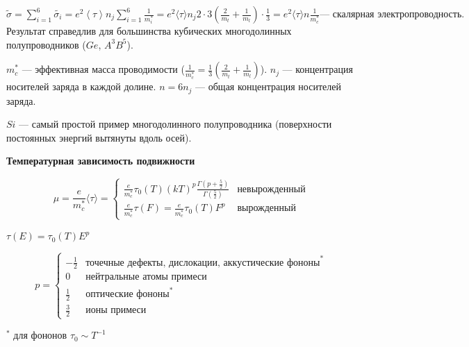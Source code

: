$\displaystyle \widetilde{\sigma}=\sum_{i=1}^6 \widetilde{\sigma_i}=e^2\left\langle\tau \right\rangle n_j \sum_{i=1}^6 \frac{1}{m_i^*}=e^2\langle\tau\rangle n_j 2 \cdot 3\left(\frac{2}{m_t}+\frac{1}{m_l}\right) \cdot \frac{1}{3} =e^2\langle \tau \rangle n \frac{1}{m_c^*} \text{--- скалярная электропроводность.}$ Результат справедлив для большинства кубических многодолинных полупроводников ($Ge$, $A^3B^5$).

$m_c^*$ --- эффективная масса проводимости ($\frac{1}{m_c^*}= \frac{1}{3} \left( \frac{2}{m_t}+\frac{1}{m_l} \right) $).
$n_j$ --- концентрация носителей заряда в каждой долине.
$n=6n_j$ --- общая концентрация носителей заряда.

$Si$ --- самый простой пример многодолинного полупроводника (поверхности постоянных энергий вытянуты вдоль осей).

\textbf{Температурная зависимость подвижности}

$$\mu = \frac{e}{m_c^*} \langle \tau \rangle = \left\{ \begin{array}{cc}
    \frac{e}{m_c^*} \tau_0(T)(k T)^p \frac{\Gamma\left(p+\frac{5}{2}\right)}{\Gamma\left(\frac{5}{2}\right)} & \text{невырожденный}\\
    \frac{e}{m_c^*} \tau(F)=\frac{e}{m_c^*} \tau_0(T) F^p & \text{вырожденный}
\end{array} \right.$$

$\tau (E) = \tau_0 (T)E^p$

$$
p=\left\{\begin{array}{cl}
-\frac{1}{2} & \text{точечные дефекты, дислокации, аккустические фононы}^* \\
0 & \text{нейтральные атомы примеси} \\
\frac{1}{2} & \text{оптические фононы}^* \\
\frac{3}{2} & \text{ионы примеси} 
\end{array}\right.
$$

$^*$ для фононов $\tau_0 \sim T^{-1}$

